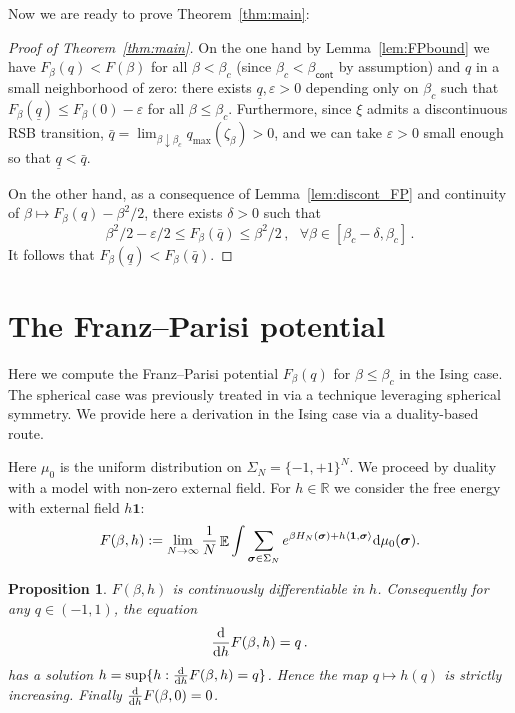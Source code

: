 \documentclass[11pt]{article}
\newtheorem{proposition}[theorem]{Proposition}
\theoremstyle{definition}
\numberwithin{equation}{section}
\def\reals{{\mathbb R}}
\newcommand{\<}{\langle}
\renewcommand{\>}{\rangle}
\def\bsigma{{\boldsymbol{\sigma}}}
\def\bbE{{\mathbb{E}}}
\def\de{{\rm d}}
\def\bsig{{\boldsymbol {\sigma}}}
\DeclareMathOperator*{\E}{\bbE}
\def\eps{\varepsilon}
\def\cont{{\mathsf{cont}}}
\begin{document}
Now we are ready to prove Theorem~\ref{thm:main}:
\begin{proof}[Proof of Theorem~\ref{thm:main}]
 On the one hand by Lemma~\ref{lem:FPbound} we have $F_{\beta}(q) < F(\beta)$ for all $\beta < \beta_c$ (since $\beta_{c} < \beta_{\cont}$ by assumption) and $q$ in a small neighborhood of zero: there exists $\underline{q}, \eps>0$ depending only on $\beta_c$ such that $F_{\beta}(\underline{q})\le F_{\beta}(0)-\eps$ for all $\beta \le \beta_c$. Furthermore, since $\xi$ admits a discontinuous RSB transition, $\bar{q} = \lim_{\beta\downarrow \beta_c}
    q_{\max}(\zeta_{\beta})>0$, and we can take $\eps>0$ small enough so that $\underline{q} <  \bar{q}$.

On the other hand,
as a consequence of Lemma~\ref{lem:discont_FP} and continuity of $\beta \mapsto F_{\beta}(q) - \beta^2/2$, there exists $\delta>0$ such that 
\[\beta^2/2 - \eps/2 \le F_{\beta}(\bar{q}) \le \beta^2/2 \, ,~~~ \forall \beta \in [\beta_c-\delta,\beta_c]\,.\]
%
It follows that $F_{\beta}(\underline{q}) < F_{\beta}(\bar{q})$.
\end{proof}


\section{The Franz--Parisi potential}
\label{sec:FP}

Here we compute the Franz--Parisi potential $F_{\beta}(q)$ for $\beta\leq\beta_c$ in the Ising case. The spherical case was previously treated in \cite{alaoui2023shattering} via a technique leveraging spherical symmetry. We provide here a derivation in the Ising case via a duality-based route.



Here $\mu_0$ is the uniform distribution on $\Sigma_N=\{-1,+1\}^N$. We proceed by duality with a model with non-zero external field. 
For $h \in \reals$ we consider the free energy with external field $h \mathbf{1}$:  
 \begin{align}
F(\beta,h) := \lim_{N\to \infty} \frac{1}{N} \E \int \sum_{\bsigma \in \Sigma_N} e^{\beta H_N(\bsigma) + h\langle \mathbf{1} , \bsigma \rangle} \de\mu_0(\bsig).
\end{align}



\begin{proposition}\label{prop:duality}
$F(\beta, h)$ is continuously differentiable in $h$.
Consequently for any $q \in (-1,1)$, the equation 
\begin{equation}\label{eq:stateq}
    \frac{\de}{\de h} F(\beta, h) = q\, .
\end{equation} 
has a solution $h = \sup\{h: \frac{\de}{\de h} F(\beta, h) = q\}$.
Hence the map $q \mapsto h(q)$ is strictly increasing.
Finally $\frac{\de}{\de h} F(\beta, 0)=0$.
\end{proposition}
\end{document}
